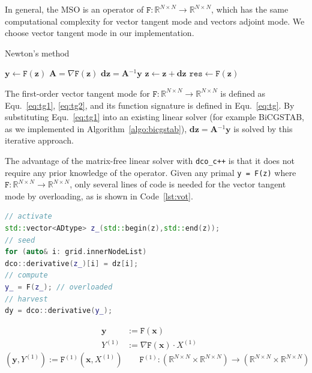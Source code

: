 \documentclass[11pt]{scrartcl}
\newcommand{\inv}{\ensuremath{^{-1}}}
\newcommand{\vect}[1]{\boldsymbol{#1}}
\newcommand{\rb}[1]{\left( #1 \right)}
\begin{document}
In general, the MSO is an operator of $ \mathtt{F}: \mathbb{R}^{N\times N}\rightarrow \mathbb{R}^{N\times N} $, which has the same computational complexity for vector tangent mode and vectors adjoint mode. We choose vector tangent mode in our implementation.

\begin{algorithm}[H]
	\caption{Newton's method}\label{algo:matfree-newton}
	\begin{algorithmic}
		\State $\vect{y} \gets \mathtt{F}(\vect{z})$ 
		\While{$\lVert \vect{y} \rVert > \textsc{tol}$} 
		\State $\vect{A} = \nabla \mathtt{F}(\vect{z})$ 
		\State \color{blue} $\vect{dz} = \vect{A}\inv \vect{y}$  \normalcolor {}
		\State $\vect{z} \gets \vect{z} + \vect{dz}$
		\State $\mathtt{res} \gets \mathtt{F}(\vect{z})$ 
		\EndWhile
	\end{algorithmic}
\end{algorithm}

The first-order vector tangent mode for $\mathtt{F}: \mathbb{R}^{N\times N}\rightarrow \mathbb{R}^{N\times N} $ is defined as Equ.~\eqref{eq:tg1}, \eqref{eq:tg2}, and its function signature is defined in Equ.~\eqref{eq:tg}. By substituting Equ.~\eqref{eq:tg1} into an existing linear solver (for example BiCGSTAB, as we implemented in Algorithm~\ref{algo:bicgstab}), $\vect{dz} = \vect{A}\inv \vect{y}$ is solved by this iterative approach.

The advantage of the matrix-free linear solver with \texttt{dco\_c++} is that it does not require any prior knowledge of the operator. Given any primal \texttt{y = F(z)} where $ \mathtt{F}: \mathbb{R}^{N\times N}\rightarrow \mathbb{R}^{N\times N} $, only several lines of code is needed for the vector tangent mode by overloading, as is shown in Code~\ref{lst:vot}.
\begin{lstlisting}[caption={Vectors of Tangents by Overloading},label=lst:vot,language=C++]
// activate
std::vector<ADtype> z_(std::begin(z),std::end(z));
// seed
for (auto& i: grid.innerNodeList) 
dco::derivative(z_)[i] = dz[i];
// compute
y_ = F(z_); // overloaded
// harvest
dy = dco::derivative(y_);
\end{lstlisting}

\begin{align}
\textbf{y} &:= \mathtt{F}(\textbf{x})\label{eq:tg1} &&
\\
Y^{(1)} &:= \nabla \mathtt{F}(\textbf{x}) \cdot X^{(1)}\label{eq:tg2}
\end{align}
\begin{equation}
\rb{\textbf{y}, Y^{(1)}} := \mathtt{F}^{(1)}\rb{\textbf{x}, X^{(1)}}\qquad \mathtt{F}^{(1)}: \rb{\mathbb{R}^{N\times N}\times \mathbb{R}^{N\times N}}\rightarrow \rb{\mathbb{R}^{N\times N}\times\mathbb{R}^{N\times N}}\label{eq:tg}
\end{equation}
\end{document}
